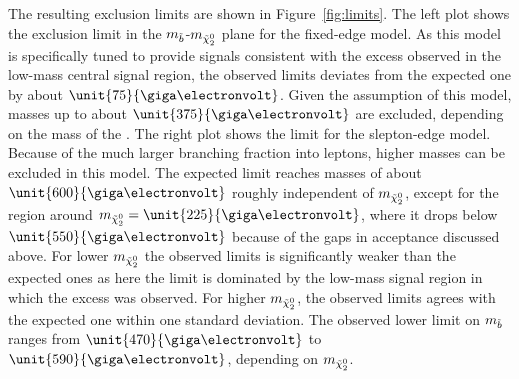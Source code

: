 The resulting exclusion limits are shown in Figure~\ref{fig:limits}. The left plot shows the exclusion limit in the $m_{\tilde{b}}$-$m_{{\tilde{\chi}^0_2}}$ plane for the fixed-edge model. As this model is specifically tuned to provide signals consistent with the excess observed in the low-mass central signal region, the observed limits deviates from the expected one by about $\unit{75}{\giga\electronvolt}$. Given the assumption of this model, \sbottom masses up to about $\unit{375}{\giga\electronvolt}$ are excluded, depending on the mass of the \secondchi. The right plot shows the limit for the slepton-edge model. Because of the much larger branching fraction into leptons, higher masses can be excluded in this model. The expected limit reaches \sbottom masses of about $\unit{600}{\giga\electronvolt}$ roughly independent of $m_{{\tilde{\chi}^0_2}}$, except for the region around $m_{\secondchi} = \unit{225}{\giga\electronvolt}$, where it drops below $\unit{550}{\giga\electronvolt}$ because of the gaps in acceptance discussed above. For lower $m_{{\tilde{\chi}^0_2}}$ the observed limits is significantly weaker than the expected ones as here the limit is dominated by the low-mass signal region in which the excess was observed. For higher $m_{{\tilde{\chi}^0_2}}$, the observed limits agrees with the expected one within one standard deviation. The observed lower limit on $m_{\tilde{b}}$ ranges from $\unit{470}{\giga\electronvolt}$ to $\unit{590}{\giga\electronvolt}$, depending on $m_{{\tilde{\chi}^0_2}}$.
